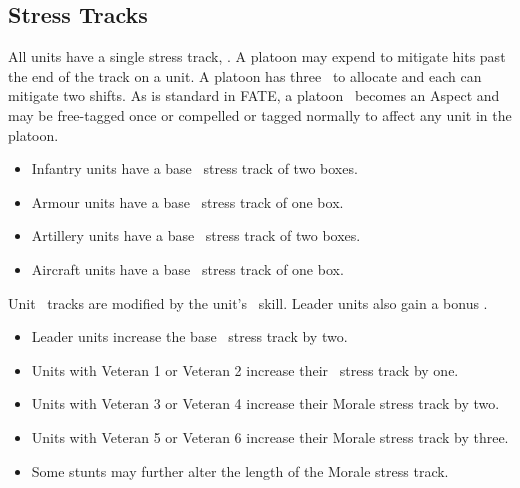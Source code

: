 \subsection{Stress Tracks}\label{sec:platoon-unit-stress-tracks}

All units have a single stress track, \Morale. A platoon may expend \Consequences to mitigate hits past the end of the track on a unit. A platoon has three \Consequences\ to allocate and each can mitigate two shifts. As is standard in FATE, a platoon \Consequence\ becomes an Aspect and may be free-tagged once or compelled or tagged normally to affect any unit in the platoon.

\begin{itemize}
\item Infantry units have a base \Morale\ stress track of two boxes.
\item Armour units have a base \Morale\ stress track of one box.
\item Artillery units have a base \Morale\ stress track of two boxes.
\item Aircraft units have a base \Morale\ stress track of one box.
\end{itemize}

Unit \Morale\ tracks are modified by the unit's \Veteran\ skill. Leader units also gain a bonus \Morale.

\begin{itemize}
\item Leader units increase the base \Morale\ stress track by two.
\item Units with Veteran 1 or Veteran 2 increase their \Morale\ stress track by one.
\item Units with Veteran 3 or Veteran 4 increase their Morale stress track by two.
\item Units with Veteran 5 or Veteran 6 increase their Morale stress track by three.
\item Some stunts may further alter the length of the Morale stress track.
\end{itemize}


